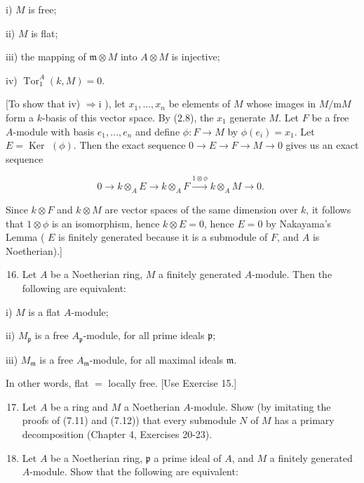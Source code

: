 \documentclass{standalone}
\theoremstyle{definition}
\theoremstyle{remark}
\begin{document}
i) $M$ is free;

ii) $M$ is flat;

iii) the mapping of $\mathfrak{m} \otimes M$ into $A \otimes M$ is injective;

iv) $\operatorname{Tor}_{1}^{A}(k, M)=0$.

[To show that iv) $\Rightarrow \mathrm{i}$ ), let $x_{1}, \ldots, x_{n}$ be elements of $M$ whose images in $M / \mathrm{m} M$ form a $k$-basis of this vector space. By (2.8), the $x_{1}$ generate $M$. Let $F$ be a free $A$-module with basis $e_{1}, \ldots, e_{n}$ and define $\phi: F \rightarrow M$ by $\phi\left(e_{i}\right)=x_{1}$. Let $E=\operatorname{Ker}$ $(\phi)$. Then the exact sequence $0 \rightarrow E \rightarrow F \rightarrow M \rightarrow 0$ gives us an exact sequence

\[
0 \longrightarrow k \otimes_{A} E \longrightarrow k \otimes_{A} F \stackrel{1 \otimes \phi}{\longrightarrow} k \otimes_{A} M \longrightarrow 0 \text {. }
\]

Since $k \otimes F$ and $k \otimes M$ are vector spaces of the same dimension over $k$, it follows that $1 \otimes \phi$ is an isomorphism, hence $k \otimes E=0$, hence $E=0$ by Nakayama's Lemma ( $E$ is finitely generated because it is a submodule of $F$, and $A$ is Noetherian).]

\begin{enumerate}
  \setcounter{enumi}{15}
  \item Let $A$ be a Noetherian ring, $M$ a finitely generated $A$-module. Then the following are equivalent:
\end{enumerate}

i) $M$ is a flat $A$-module;

ii) $M_{\mathfrak{p}}$ is a free $A_{\mathfrak{p}}$-module, for all prime ideals $\mathfrak{p}$;

iii) $M_{\mathfrak{m}}$ is a free $A_{\mathfrak{m}}$-module, for all maximal ideals $\mathfrak{m}$.

In other words, flat $=$ locally free. [Use Exercise 15.]

\begin{enumerate}
  \setcounter{enumi}{16}
  \item Let $A$ be a ring and $M$ a Noetherian $A$-module. Show (by imitating the proofs of (7.11) and (7.12)) that every submodule $N$ of $M$ has a primary decomposition (Chapter 4, Exercises 20-23).

  \item Let $A$ be a Noetherian ring, $\mathfrak{p}$ a prime ideal of $A$, and $M$ a finitely generated $A$-module. Show that the following are equivalent:

\end{enumerate}
\end{document}
